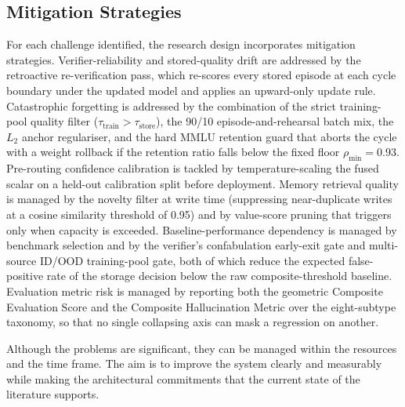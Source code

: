 \subsection{Mitigation Strategies}

For each challenge identified, the research design incorporates mitigation strategies. Verifier-reliability and stored-quality drift are addressed by the retroactive re-verification pass, which re-scores every stored episode at each cycle boundary under the updated model and applies an upward-only update rule. Catastrophic forgetting is addressed by the combination of the strict training-pool quality filter ($\tau_{\text{train}} > \tau_{\text{store}}$), the 90/10 episode-and-rehearsal batch mix, the $L_{2}$ anchor regulariser, and the hard MMLU retention guard that aborts the cycle with a weight rollback if the retention ratio falls below the fixed floor $\rho_{\min} = 0.93$. Pre-routing confidence calibration is tackled by temperature-scaling the fused scalar on a held-out calibration split before deployment. Memory retrieval quality is managed by the novelty filter at write time (suppressing near-duplicate writes at a cosine similarity threshold of 0.95) and by value-score pruning that triggers only when capacity is exceeded. Baseline-performance dependency is managed by benchmark selection and by the verifier's confabulation early-exit gate and multi-source ID/OOD training-pool gate, both of which reduce the expected false-positive rate of the storage decision below the raw composite-threshold baseline. Evaluation metric risk is managed by reporting both the geometric Composite Evaluation Score and the Composite Hallucination Metric over the eight-subtype taxonomy, so that no single collapsing axis can mask a regression on another.

Although the problems are significant, they can be managed within the resources and the time frame. The aim is to improve the system clearly and measurably while making the architectural commitments that the current state of the literature supports.